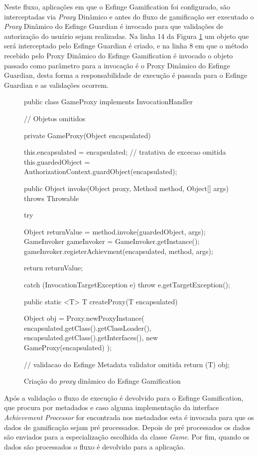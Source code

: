 Neste fluxo, aplicações em que o Esfinge Gamification foi configurado, são interceptadas via \textit{Proxy} Dinâmico e antes do fluxo de gamificação ser executado o \textit{Proxy} Dinâmico do Esfinge Guardian é invocado para que validações de autorização do usuário sejam realizadas. Na linha 14 da Figura \ref{fig:esfinge-proxy} um objeto que será interceptado pelo Esfinge Guardian é criado, e na linha 8 em que o método recebido pelo Proxy Dinâmico do Esfinge Gamification é invocado o objeto passado como parâmetro para a invocação é o Proxy Dinâmico do Esfinge Guardian, desta forma a responsabilidade de execução é passada para o Esfinge Guardian e as validações ocorrem.

\begin{figure}[H]
    \centering
    \begin{java}
public class GameProxy implements InvocationHandler {

    // Objetos omitidos

    private GameProxy(Object encapsulated) {
                this.encapsulated = encapsulated;
    	// tratativa de excecao omitida
    	this.guardedObject = AuthorizationContext.guardObject(encapsulated);
    	
    }

    public Object invoke(Object proxy, Method method, Object[] args) throws Throwable {
    	try {
        	Object returnValue = method.invoke(guardedObject, args);
        	GameInvoker gameInvoker = GameInvoker.getInstance();
        	gameInvoker.registerAchievment(encapsulated, method, args);
    
    	    return returnValue;
    	} catch (InvocationTargetException e) {
    	    throw e.getTargetException();
    	}
    }
    
    public static <T> T createProxy(T encapsulated) {
    	Object obj = Proxy.newProxyInstance(
                    encapsulated.getClass().getClassLoader(),
                    encapsulated.getClass().getInterfaces(), 
                    new GameProxy(encapsulated)
    	);
    
    	// validacao do Esfinge Metadata validator omitida
    	return (T) obj;
    }
}
    \end{java}
    \caption{Criação do \textit{proxy} dinâmico do Esfinge Gamification}
    \label{fig:esfinge-proxy}
\end{figure}


Após a validação o fluxo de execução é devolvido para o Esfinge Gamification, que procura por metadados e caso alguma implementação da interface \textit{Achievement Processor} for encontrada nos metadados esta é invocada para que os dados de gamificação sejam pré processados. Depois de pré processados os dados são enviados para a especialização escolhida da classe \textit{Game}. Por fim, quando os dados são processados o fluxo é devolvido para a aplicação.

